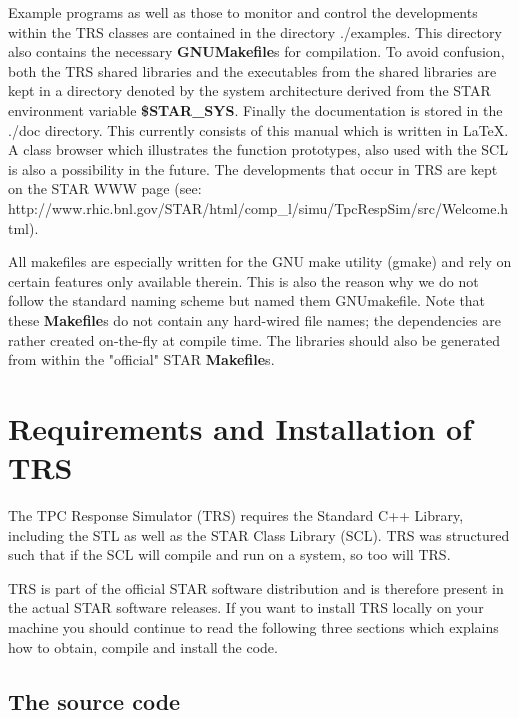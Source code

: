 \documentclass[twoside]{article}
\newcommand{\name}[1]{\textsf{#1}}%
\begin{document}
Example programs as well as those to monitor and control the developments
within the \name{TRS} classes are contained in the directory \name{./examples}.
This directory also contains the necessary {\bf GNUMakefile}s for 
compilation.  To avoid confusion, both the \name{TRS} shared libraries and the
executables from the shared libraries are kept in a directory denoted by
the system architecture derived from the STAR environment
variable {\bf \$STAR\_SYS}.  Finally the documentation is stored in the
\name{./doc} directory.  This currently consists of this manual which
is written in \LaTeX.  A class browser which illustrates the function
prototypes, also used with the SCL is also a possibility in the future.
The developments that occur in TRS are kept on the STAR WWW 
page (see: http://www.rhic.bnl.gov/STAR/html/comp\_l/simu/TpcRespSim/src/Welcome.html).

All makefiles are especially written for the \name{GNU} make utility (gmake) 
and rely on
certain features only available therein. This is also the reason why we do not
follow the standard naming scheme but named them \name{GNUmakefile}. 
Note that these {\bf Makefile}s do not contain any hard-wired file names;
the dependencies are rather created on-the-fly at compile time.  The
libraries should also be generated from within the "official" STAR
{\bf Makefile}s.

\section{Requirements and Installation of TRS}   
\label{install}

The TPC Response Simulator (\name{TRS}) requires the Standard C++ Library,
including the STL  as well as the STAR Class Library (SCL).
\name{TRS} was structured such that if the SCL will
compile and run on a system, so too will \name{TRS}.

\name{TRS} is part of the official STAR software distribution
and is therefore present in the actual STAR software releases.
If you want to install \name{TRS} locally on your machine you should
continue to read the following three sections which explains how to
obtain, compile and install the code.

\subsection{The source code} 
\end{document}
